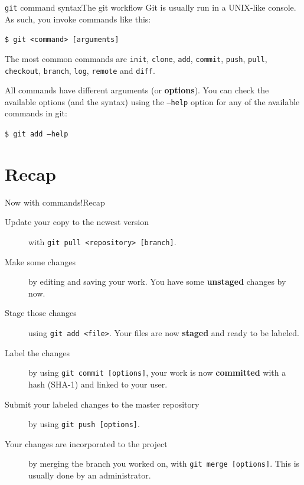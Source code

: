 \documentclass[dvipsnames, usenames]{beamer}
\begin{document}
\begin{frame}{\texttt{git} command syntax}{The git workflow}
	Git is usually run in a \textsc{UNIX}-like console. As such, you invoke \alert{commands} like this: \pause

	\begin{center}
		\Large
		\texttt{\$ git <command> [arguments]}
	\end{center} \pause

	The most common commands are \texttt{init}, \texttt{clone}, \texttt{add}, \texttt{commit}, \texttt{push}, \texttt{pull}, \texttt{checkout}, \texttt{branch}, \texttt{log}, \texttt{remote} and \texttt{diff}. \pause

	All commands have different \alert{arguments} (or \textbf{options}). You can check the available options (and the syntax) using the \texttt{--help} option for any of the available commands in git: \pause

	\begin{center}
		\Large
		\texttt{\$ git add --help}
	\end{center}
\end{frame}

\section{Recap}

\begin{frame}{Now with commands!}{Recap}
	\begin{description}
		\item[Update your copy to the newest version] with \texttt{git pull <repository> [branch]}.
		\item[Make some changes] by editing and saving your work. You have some \textbf{unstaged} changes by now.
		\item[Stage those changes] using \texttt{git add <file>}. Your files are now \textbf{staged} and ready to be labeled.
		\item[Label the changes] by using \texttt{git commit [options]}, your work is now \textbf{committed} with a hash (SHA-1) and linked to your user.
		\item[Submit your labeled changes to the master repository] by using \texttt{git push [options]}.
		\item[Your changes are incorporated to the project] by merging the branch you worked on, with \texttt{git merge [options]}. This is usually done by an administrator.
	\end{description}
\end{frame}
\end{document}
